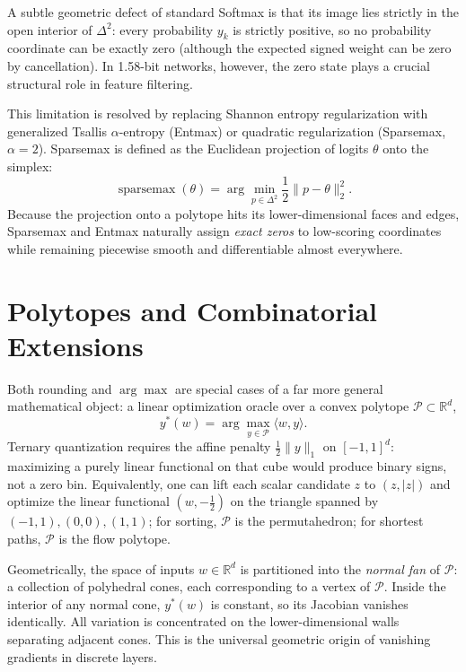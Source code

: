 A subtle geometric defect of standard Softmax is that its image lies strictly in the open interior of $\Delta^2$: every probability $y_k$ is strictly positive, so no probability coordinate can be exactly zero (although the expected signed weight can be zero by cancellation). In 1.58-bit networks, however, the zero state plays a crucial structural role in feature filtering.

This limitation is resolved by replacing Shannon entropy regularization with generalized Tsallis $\alpha$-entropy (Entmax) or quadratic regularization (Sparsemax, $\alpha = 2$). Sparsemax is defined as the Euclidean projection of logits $\theta$ onto the simplex:
\begin{equation}
    \operatorname{sparsemax}(\theta) = \arg\min_{p \in \Delta^2} \frac{1}{2} \|p - \theta\|_2^2.
\end{equation}
Because the projection onto a polytope hits its lower-dimensional faces and edges, Sparsemax and Entmax naturally assign \emph{exact zeros} to low-scoring coordinates while remaining piecewise smooth and differentiable almost everywhere.

\section{Polytopes and Combinatorial Extensions}

Both rounding and $\arg\max$ are special cases of a far more general mathematical object: a linear optimization oracle over a convex polytope $\mathcal{P} \subset \mathbb{R}^d$,
\begin{equation}
    y^*(w) = \arg\max_{y \in \mathcal{P}} \langle w, y \rangle.
\end{equation}
Ternary quantization requires the affine penalty $\tfrac12\|y\|_1$ on $[-1,1]^d$: maximizing a purely linear functional on that cube would produce binary signs, not a zero bin. Equivalently, one can lift each scalar candidate $z$ to $(z,|z|)$ and optimize the linear functional $(w,-\tfrac12)$ on the triangle spanned by $(-1,1),(0,0),(1,1)$; for sorting, $\mathcal{P}$ is the permutahedron; for shortest paths, $\mathcal{P}$ is the flow polytope.

Geometrically, the space of inputs $w \in \mathbb{R}^d$ is partitioned into the \emph{normal fan} of $\mathcal{P}$: a collection of polyhedral cones, each corresponding to a vertex of $\mathcal{P}$. Inside the interior of any normal cone, $y^*(w)$ is constant, so its Jacobian vanishes identically. All variation is concentrated on the lower-dimensional walls separating adjacent cones. This is the universal geometric origin of vanishing gradients in discrete layers.

